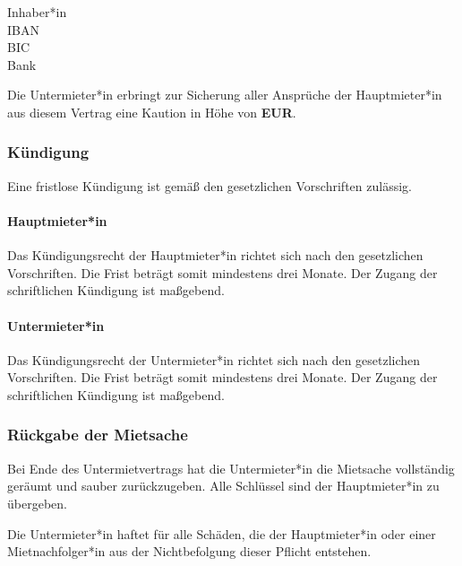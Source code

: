 \vspace{2ex}
\begin{addmargin}[.25\textwidth]{.25\textwidth}
  Inhaber*in \MYdotfill \textbf{\ACCOUNTowner} \\
  IBAN \MYdotfill \textbf{\ACCOUNTiban} \\
  BIC \MYdotfill \textbf{\ACCOUNTbic} \\
  Bank \MYdotfill \textbf{\ACCOUNTinstitute}
\end{addmargin}
\vspace{2ex}

Die Untermieter*in erbringt zur Sicherung aller Ansprüche der
Hauptmieter*in aus diesem Vertrag eine Kaution in Höhe von
\textbf{\CONTRACTdeposit{} EUR}.

\subsubsection*{Kündigung}

Eine fristlose Kündigung ist gemäß den gesetzlichen Vorschriften zulässig.

\paragraph{Hauptmieter*in} Das Kündigungsrecht der Hauptmieter*in
richtet sich nach den gesetzlichen Vorschriften. Die Frist beträgt somit
mindestens drei Monate. Der Zugang der schriftlichen Kündigung ist
maßgebend.

\paragraph{Untermieter*in} Das Kündigungsrecht der Untermieter*in
richtet sich nach den gesetzlichen Vorschriften. Die Frist beträgt somit
mindestens drei Monate. Der Zugang der schriftlichen Kündigung ist
maßgebend.

\subsubsection*{Rückgabe der Mietsache}

Bei Ende des Untermietvertrags hat die Untermieter*in die Mietsache
vollständig geräumt und sauber zurückzugeben. Alle Schlüssel sind der
Hauptmieter*in zu übergeben.

Die Untermieter*in haftet für alle Schäden, die der Hauptmieter*in
oder einer Mietnachfolger*in aus der Nichtbefolgung dieser Pflicht
entstehen.

